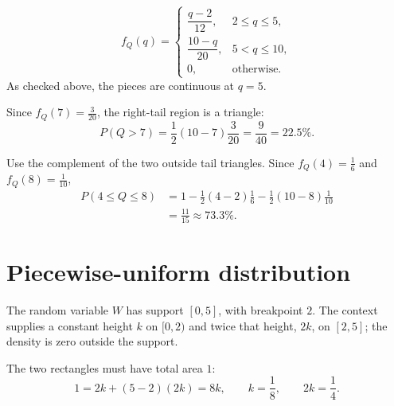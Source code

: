 	\[
	f_Q(q)=\begin{cases}
		\dfrac{q-2}{12},&2\le q\le5,\\[1mm]
		\dfrac{10-q}{20},&5<q\le10,\\[1mm]
		0,&\text{otherwise.}
	\end{cases}
	\]
	As checked above, the pieces are continuous at $q=5$.
	
	Since $f_Q(7)=\frac3{20}$, the right-tail region is a triangle:
	\[
	P(Q>7)=\frac12(10-7)\frac3{20}=\frac9{40}=22.5\%.
	\]
	
	Use the complement of the two outside tail triangles.  Since
	$f_Q(4)=\frac16$ and $f_Q(8)=\frac1{10}$,
	\[
	\begin{aligned}P(4\le Q\le8)
		&=1-\frac12(4-2)\frac16-\frac12(10-8)\frac1{10}\\
		&=\frac{11}{15}\approx73.3\%.
	\end{aligned}
	\]
	
	
	\section{Piecewise-uniform distribution}
	
	The random variable $W$ has support $[0,5]$, with breakpoint $2$.  The context
	supplies a constant height $k$ on $[0,2)$ and twice that height, $2k$, on
	$[2,5]$; the density is zero outside the support.
	
	The two rectangles must have total area $1$:
	\[
	1=2k+(5-2)(2k)=8k,\qquad k=\frac18,\qquad2k=\frac14.
	\]
	
